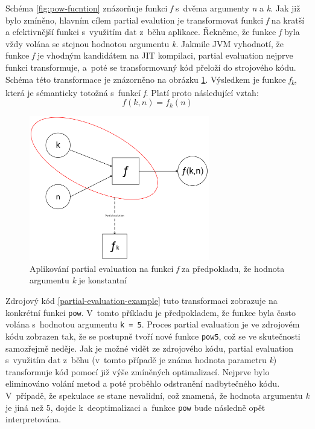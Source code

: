 \documentclass[
  master,
  biblatex,
  figures=true,
  theorems,
  sourcecodes,
  glossaries,
  index
]{kidiplom}
\begin{document}
Schéma \ref{fig:pow-fucntion} znázorňuje funkci \textit{f} s~dvěma argumenty \textit{n} a \textit{k}. Jak již bylo zmíněno, hlavním cílem partial evalution je transformovat funkci \textit{f} na kratší a efektivnější funkci s~využitím dat z~běhu aplikace. Řekněme, že funkce \textit{f} byla vždy volána se stejnou hodnotou argumentu \textit{k}. Jakmile JVM vyhodnotí, že funkce \textit{f} je vhodným kandidátem na JIT kompilaci, partial evaluation nejprve funkci transformuje, a~poté se transformovaný kód přeloží do strojového kódu. Schéma této transformace je znázorněno na obrázku \ref{fig:applied-PE-pow-fucntion}. Výsledkem je funkce \textit{f\textsubscript{k}}, která je sémanticky totožná s~funkcí \textit{f}. Platí proto následující vztah: \[ f(k, n) = f_{k}(n) \]

\begin{figure} [h]
    \centering
    \includegraphics[width= 0.7\textwidth]{images/pow-PE.png}
    \caption{Aplikování partial evaluation na funkci \textit{f} za předpokladu, že hodnota argumentu \textit{k} je konstantní}
    \label{fig:applied-PE-pow-fucntion}
\end{figure}


Zdrojový kód \ref{partial-evaluation-example} tuto transformaci zobrazuje na konkrétní funkci \texttt{pow}. V~tomto příkladu je předpokladem, že funkce byla často volána s~hodnotou argumentu \texttt{k~=~5}. Proces partial evaluation je ve zdrojovém kódu zobrazen tak, že se postupně tvoří nové funkce \texttt{pow5}, což se ve skutečnosti samozřejmě neděje. Jak je možné vidět ze zdrojového kódu, partial evaluation s~využitím dat z~běhu (v~tomto případě je známa hodnota parametru \textit{k}) transformuje kód pomocí již výše zmíněných optimalizací. Nejprve bylo eliminováno volání metod a poté proběhlo odstranění nadbytečného kódu. V~případě, že spekulace se stane nevalidní, což znamená, že hodnota argumentu \textit{k} je jiná než 5, dojde k~deoptimalizaci a~funkce \texttt{pow} bude následně opět interpretována. 
\end{document}
